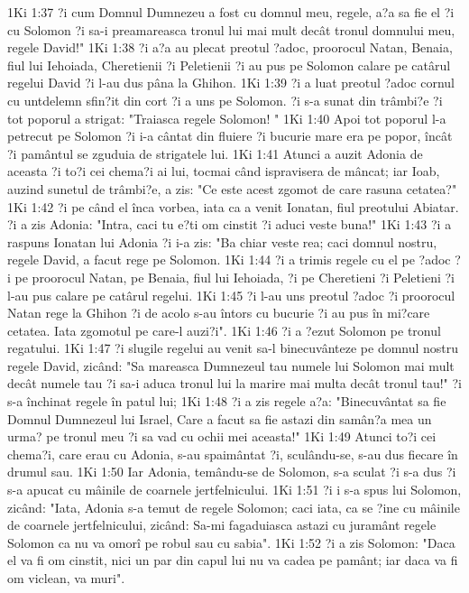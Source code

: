 1Ki 1:37  ?i cum Domnul Dumnezeu a fost cu domnul meu, regele, a?a sa fie el ?i cu Solomon ?i sa-i preamareasca tronul lui mai mult decât tronul domnului meu, regele David!"
1Ki 1:38  ?i a?a au plecat preotul ?adoc, proorocul Natan, Benaia, fiul lui Iehoiada, Cheretienii ?i Peletienii ?i au pus pe Solomon calare pe catârul regelui David ?i l-au dus pâna la Ghihon.
1Ki 1:39  ?i a luat preotul ?adoc cornul cu untdelemn sfin?it din cort ?i a uns pe Solomon. ?i s-a sunat din trâmbi?e ?i tot poporul a strigat: "Traiasca regele Solomon! "
1Ki 1:40  Apoi tot poporul l-a petrecut pe Solomon ?i i-a cântat din fluiere ?i bucurie mare era pe popor, încât ?i pamântul se zguduia de strigatele lui.
1Ki 1:41  Atunci a auzit Adonia de aceasta ?i to?i cei chema?i ai lui, tocmai când ispravisera de mâncat; iar Ioab, auzind sunetul de trâmbi?e, a zis: "Ce este acest zgomot de care rasuna cetatea?"
1Ki 1:42  ?i pe când el înca vorbea, iata ca a venit Ionatan, fiul preotului Abiatar. ?i a zis Adonia: "Intra, caci tu e?ti om cinstit ?i aduci veste buna!"
1Ki 1:43  ?i a raspuns Ionatan lui Adonia ?i i-a zis: "Ba chiar veste rea; caci domnul nostru, regele David, a facut rege pe Solomon.
1Ki 1:44  ?i a trimis regele cu el pe ?adoc ?i pe proorocul Natan, pe Benaia, fiul lui Iehoiada, ?i pe Cheretieni ?i Peletieni ?i l-au pus calare pe catârul regelui.
1Ki 1:45  ?i l-au uns preotul ?adoc ?i proorocul Natan rege la Ghihon ?i de acolo s-au întors cu bucurie ?i au pus în mi?care cetatea. Iata zgomotul pe care-l auzi?i".
1Ki 1:46  ?i a ?ezut Solomon pe tronul regatului.
1Ki 1:47  ?i slugile regelui au venit sa-l binecuvânteze pe domnul nostru regele David, zicând: "Sa mareasca Dumnezeul tau numele lui Solomon mai mult decât numele tau ?i sa-i aduca tronul lui la marire mai multa decât tronul tau!" ?i s-a închinat regele în patul lui;
1Ki 1:48  ?i a zis regele a?a: "Binecuvântat sa fie Domnul Dumnezeul lui Israel, Care a facut sa fie astazi din samân?a mea un urma? pe tronul meu ?i sa vad cu ochii mei aceasta!"
1Ki 1:49  Atunci to?i cei chema?i, care erau cu Adonia, s-au spaimântat ?i, sculându-se, s-au dus fiecare în drumul sau.
1Ki 1:50  Iar Adonia, temându-se de Solomon, s-a sculat ?i s-a dus ?i s-a apucat cu mâinile de coarnele jertfelnicului.
1Ki 1:51  ?i i s-a spus lui Solomon, zicând: "Iata, Adonia s-a temut de regele Solomon; caci iata, ca se ?ine cu mâinile de coarnele jertfelnicului, zicând: Sa-mi fagaduiasca astazi cu juramânt regele Solomon ca nu va omorî pe robul sau cu sabia".
1Ki 1:52  ?i a zis Solomon: "Daca el va fi om cinstit, nici un par din capul lui nu va cadea pe pamânt; iar daca va fi om viclean, va muri".
